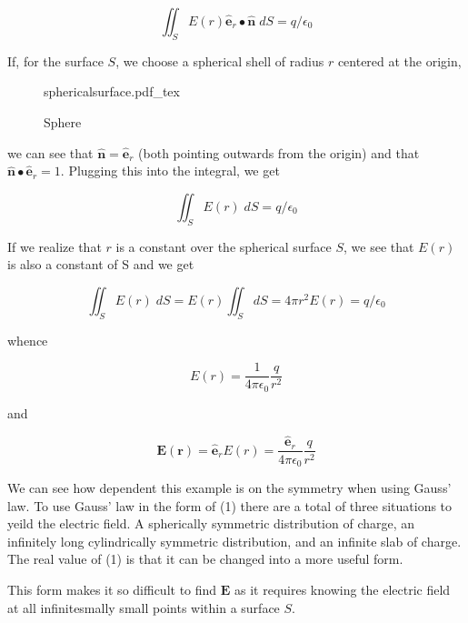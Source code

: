 \documentclass[11pt]{article}
\newcommand{\incfig}[2][1]{%
    \def\svgwidth{#1\columnwidth}
    {#2.pdf_tex}
}
\begin{document}
\begin{equation}
	\iint_S E(r) \mathbf{\hat{e}}_r \bullet \mathbf{\hat{n}} \; dS = q/ \epsilon_0
\end{equation}

If, for the surface $S$, we choose a spherical shell of radius $r$ centered at the origin,

\begin{figure}[ht]
    \centering
    \incfig{sphericalsurface}
    \caption{Sphere}
    \label{fig:sphericalsurface}
\end{figure}

we can see that $\mathbf{\hat{n}} = \mathbf{\hat{e}}_r$ (both pointing outwards from the origin) and that $\mathbf{\hat{n}} \bullet \mathbf{\hat{e}}_r = 1$. Plugging this into the integral, we get

\begin{equation}
	\iint_S E(r) \; dS = q/ \epsilon_0
\end{equation}

If we realize that $r$ is a constant over the spherical surface $S$, we see that $E(r)$ is also a constant of S and we get

\begin{equation}
	\iint_S E(r) \; dS = E(r) \iint_S dS = 4 \pi r^2 E(r) = q / \epsilon_0
\end{equation}

whence

\begin{equation}
	E(r) = \frac{1}{4 \pi \epsilon_0} \frac {q}{r^2}
\end{equation}

and

\begin{equation}
	\mathbf{E(r)} = \mathbf{\hat{e}}_r E(r) = \frac {\mathbf{\hat{e}}_r} {4 \pi \epsilon_0} \frac {q} {r^2}
\end{equation}

We can see how dependent this example is on the symmetry when using Gauss' law. To use Gauss' law in the form of (1) there are a total of three situations to yeild the electric field. A spherically symmetric distribution of charge, an infinitely long cylindrically symmetric distribution, and an infinite slab of charge. The real value of (1) is that it can be changed into a more useful form.

This form makes it so difficult to find $\mathbf{E}$ as it requires knowing the electric field at all infinitesmally small points within a surface $S$.
\end{document}
